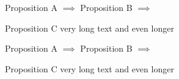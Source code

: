 \documentclass{beamer}
\begin{document}
\begin{frame}

Proposition A $\implies$ Proposition B $\implies$ \parbox{.3\textwidth}{Proposition C very long text and even longer}

\bigskip

Proposition A $\implies$ Proposition B $\implies$ \parbox[t]{.3\textwidth}{Proposition C very long text and even longer}
\end{frame}
\end{document}
